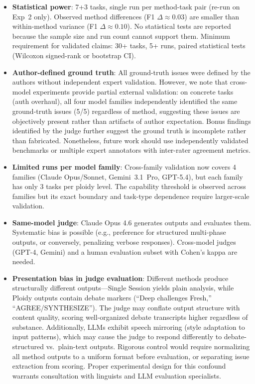 \documentclass[11pt]{article}
\begin{document}
\begin{itemize}[leftmargin=1.5em]
  \item \textbf{Statistical power}: 7+3 tasks, single run per method-task pair (re-run on Exp~2 only). Observed method differences (F1 $\Delta \approx 0.03$) are smaller than within-method variance (F1 $\Delta \approx 0.10$). No statistical tests are reported because the sample size and run count cannot support them. Minimum requirement for validated claims: 30+ tasks, 5+ runs, paired statistical tests (Wilcoxon signed-rank or bootstrap CI).
  \item \textbf{Author-defined ground truth}: All ground-truth issues were defined by the authors without independent expert validation. However, we note that cross-model experiments provide partial external validation: on concrete tasks (auth overhaul), all four model families independently identified the same ground-truth issues (5/5) regardless of method, suggesting these issues are objectively present rather than artifacts of author expectation. Bonus findings identified by the judge further suggest the ground truth is incomplete rather than fabricated. Nonetheless, future work should use independently validated benchmarks or multiple expert annotators with inter-rater agreement metrics.
  \item \textbf{Limited runs per model family}: Cross-family validation now covers 4 families (Claude Opus/Sonnet, Gemini~3.1~Pro, GPT-5.4), but each family has only 3 tasks per ploidy level. The capability threshold is observed across families but its exact boundary and task-type dependence require larger-scale validation.
  \item \textbf{Same-model judge}: Claude Opus 4.6 generates outputs and evaluates them. Systematic bias is possible (e.g., preference for structured multi-phase outputs, or conversely, penalizing verbose responses). Cross-model judges (GPT-4, Gemini) and a human evaluation subset with Cohen's kappa are needed.
  \item \textbf{Presentation bias in judge evaluation}: Different methods produce structurally different outputs---Single Session yields plain analysis, while Ploidy outputs contain debate markers (``Deep challenges Fresh,'' ``AGREE/SYNTHESIZE''). The judge may conflate output structure with content quality, scoring well-organized debate transcripts higher regardless of substance. Additionally, LLMs exhibit speech mirroring (style adaptation to input patterns), which may cause the judge to respond differently to debate-structured vs.\ plain-text outputs. Rigorous control would require normalizing all method outputs to a uniform format before evaluation, or separating issue extraction from scoring. Proper experimental design for this confound warrants consultation with linguists and LLM evaluation specialists.

\end{itemize}
\end{document}
